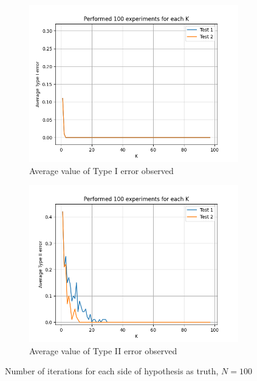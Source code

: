 \documentclass[fleqn, 11pt]{article}
\begin{document}
\vspace{0pt}
\begin{figure}[H]
    \centering
    \begin{subfigure}[H]{0.49\textwidth}
        \centering
        \includegraphics[width=\textwidth]{P3/type1_100.png}
        \caption[]{Average value of Type I error observed}
    \end{subfigure}
    \begin{subfigure}[H]{0.49\textwidth}
        \centering
        \includegraphics[width=\textwidth]{P3/type2_100.png}
        \caption[]{Average value of Type II error observed}
    \end{subfigure}
    \caption{Number of iterations for each side of hypothesis as truth, $N = 100$}
\end{figure}
\end{document}
